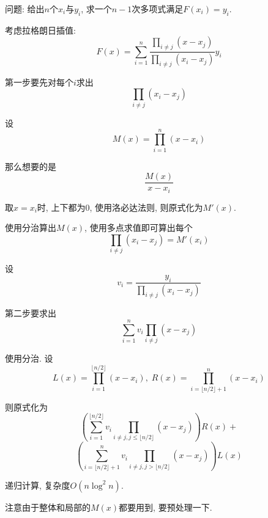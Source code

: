 问题: 给出$n$个$x_i$与$y_i$, 求一个$n-1$次多项式满足$F(x_i)=y_i$.

考虑拉格朗日插值: 
$$F(x)=\sum_{i=1}^n\frac{\prod_{i\neq j}(x-x_j)}{\prod_{i\neq j}(x_i-x_j)}y_i$$

第一步要先对每个$i$求出
$$\prod_{i\neq j}(x_i-x_j)$$

设
$$M(x)=\prod_{i=1}^{n}(x-x_i)$$

那么想要的是
$$\frac{M(x)}{x-x_i}$$

取$x=x_i$时, 上下都为0, 使用洛必达法则, 则原式化为$M'(x)$.

使用分治算出$M(x)$, 使用多点求值即可算出每个
$$\prod_{i\neq j}(x_i-x_j)=M'(x_i)$$

设
$$v_i = \frac{y_i}{\prod_{i\neq j}(x_i-x_j)}$$

第二步要求出$$\sum_{i=1}^{n}v_i\prod_{i\neq j}(x-x_j)$$

使用分治. 设
$$L(x)=\prod_{i=1}^{\lfloor n/2\rfloor}(x-x_i), \; R(x)=\prod_{i=\lfloor n/2\rfloor+1}^n(x-x_i)$$

则原式化为
$$\left( \sum_{i=1}^{\lfloor n/2\rfloor}v_i\prod_{i\neq j,j\leq\lfloor n/2\rfloor}(x-x_j)\right)R(x)+$$
$$\left( \sum_{i=\lfloor n/2\rfloor+1}^{n}v_i\prod_{i\neq j,j>\lfloor n/2\rfloor}(x-x_j)\right)L(x)$$

递归计算, 复杂度$O(n\log^2n)$.

注意由于整体和局部的$M(x)$都要用到, 要预处理一下.

\inputminted{cpp}{../src/math/多项式快速插值.cpp}